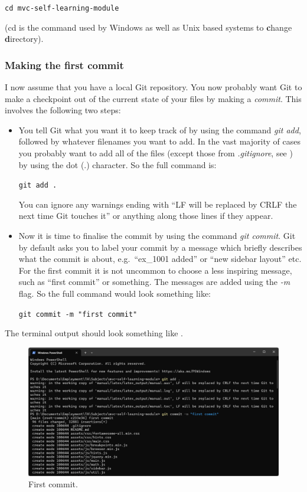 \documentclass[a4paper,10pt]{article}
\begin{document}
\texttt{cd mvc-self-learning-module}

(cd is the command used by Windows as well as Unix based systems to \textbf{c}hange \textbf{d}irectory).

\subsubsection{Making the first commit}
\label{sec:first_commit}

I now assume that you have a local Git repository. You now probably want Git to make a checkpoint out of the current state of your files by making a \emph{commit}. This involves the following two steps:
\begin{itemize}
    \item You tell Git what you want it to keep track of by using the command \emph{git add}, followed by whatever filenames you want to add. In the vast majority of cases you probably want to add all of the files (except those from \emph{.gitignore}, see ) by using the dot (.) character. So the full command is:

    \texttt{git add .}

    You can ignore any warnings ending with ``LF will be replaced by CRLF the next time Git touches it'' or anything along those lines if they appear.

    \item Now it is time to finalise the commit by using the command \emph{git commit}. Git by default asks you to label your commit by a message which briefly describes what the commit is about, e.g.\ ``ex\_1001 added'' or ``new sidebar layout'' etc. For the first commit it is not uncommon to choose a less inspiring message, such as ``first commit'' or something. The messages are added using the \emph{-m} flag. So the full command would look something like:

    \texttt{git commit -m "first commit"}    
\end{itemize}
The terminal output should look something like .

\begin{figure}[htbp]
    \centering
    \includegraphics[width=\textwidth]{first_commit.png}
    \caption{First commit.}
    \label{fig:first_commit}   
\end{figure}
\end{document}
